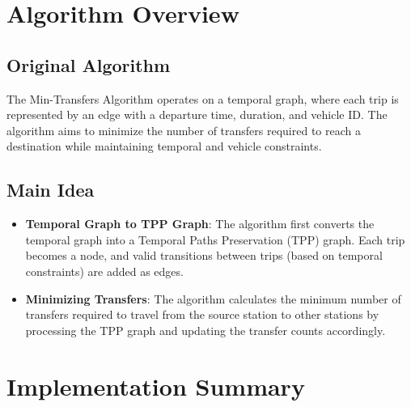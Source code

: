 \documentclass[a4paper,12pt]{article}
\begin{document}
\section{Algorithm Overview}

\subsection{Original Algorithm}
The Min-Transfers Algorithm operates on a temporal graph, where each trip is represented by an edge with a departure time, duration, and vehicle ID. The algorithm aims to minimize the number of transfers required to reach a destination while maintaining temporal and vehicle constraints.

\subsection{Main Idea}
\begin{itemize}
    \item \textbf{Temporal Graph to TPP Graph}: The algorithm first converts the temporal graph into a Temporal Paths Preservation (TPP) graph. Each trip becomes a node, and valid transitions between trips (based on temporal constraints) are added as edges.
    \item \textbf{Minimizing Transfers}: The algorithm calculates the minimum number of transfers required to travel from the source station to other stations by processing the TPP graph and updating the transfer counts accordingly.
\end{itemize}

\section{Implementation Summary}
\end{document}
